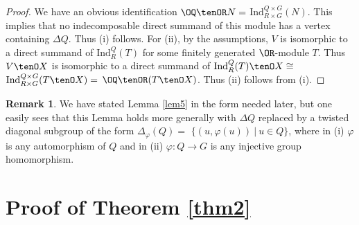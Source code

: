 \documentclass{amsart} %
\theoremstyle{plain}\newtheorem{Theorem}{Theorem}[section]
\theoremstyle{plain}\newtheorem{Conjecture}[Theorem]{Conjecture}
\theoremstyle{plain}\newtheorem{Corollary}[Theorem]{Corollary}
\theoremstyle{plain}\newtheorem{Lemma}[Theorem]{Lemma}
\theoremstyle{plain}\newtheorem{Proposition}[Theorem]{Proposition}
\theoremstyle{definition}\newtheorem{Definition}[Theorem]{Definition}
\theoremstyle{definition}\newtheorem{Example}[Theorem]{Example}
\theoremstyle{definition}\newtheorem{Examples}[Theorem]{Examples}
\theoremstyle{definition}\newtheorem{Remark}[Theorem]{Remark}
\theoremstyle{definition}\newtheorem{Remarks}[Theorem]{Remarks}
\theoremstyle{plain}\newtheorem{Statement}[Theorem]{}
\def\Ind{\mathrm{Ind}}           \def\tenK{\otimes_K}
\begin{document}
\begin{proof}
We have an obvious identification $\OQ\tenOR N=$ $\Ind^{Q\times G}_{R\times G}(N)$.
This implies that no indecomposable direct summand of this module has a vertex containing
$\Delta Q$. Thus (i) follows.   
For (ii), by the assumptions,
$V$ is isomorphic to a direct summand of $\Ind^Q_R(T)$ for some finitely generated
$\OR$-module $T$. Thus $V\tenO X$ is isomorphic to a direct summand of
$\Ind^Q_R(T)\tenO X\cong$ $\Ind^{Q\times G}_{R\times G}(T\tenO X)=$
$\OQ\tenOR (T\tenO X)$. Thus (ii) follows from (i).
\end{proof}

\begin{Remark} 
We have stated Lemma \ref{lem5} in the form needed later, but one easily 
sees that this Lemma holds more generally with $\Delta Q$ replaced
by a twisted diagonal subgroup of the form $\Delta_\varphi(Q)=$
$\{(u, \varphi(u))\ |\ u\in Q\}$, where in (i) $\varphi$ is any automorphism of
$Q$ and in (ii) $\varphi : Q\to G$ is any  injective group homomorphism.
\end{Remark}



\section{Proof of Theorem \ref{thm2}} \label{thm2-proof}%
\end{document}
